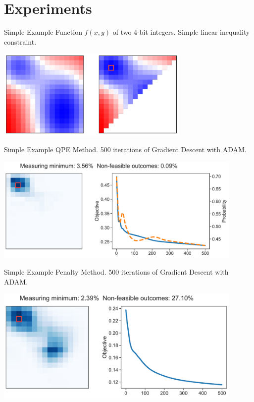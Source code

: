 \documentclass[aspectratio=169]{beamer}
\begin{document}
\section{Experiments}

\begin{frame}{Simple Example}
    Function $f(x, y)$ of two 4-bit integers. Simple linear inequality
    constraint.
    \begin{center}
        \includegraphics[width=0.7\textwidth]{../plots/example1.pdf}
    \end{center}
\end{frame}

\begin{frame}{Simple Example}
    QPE Method. 500 iterations of Gradient Descent with ADAM.
    \begin{center}
        \includegraphics[width=0.9\textwidth]{../plots/opt_example1_masked.pdf}
    \end{center}
\end{frame}

\begin{frame}{Simple Example}
    Penalty Method. 500 iterations of Gradient Descent with ADAM.
    \begin{center}
        \includegraphics[width=0.9\textwidth]{../plots/opt_example1_penalty.pdf}
    \end{center}
\end{frame}
\end{document}
